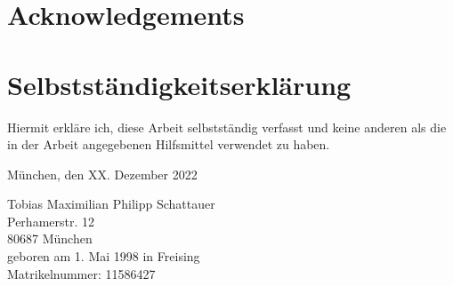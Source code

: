 \chapter*{Acknowledgements}



\chapter*{Selbstständigkeitserklärung}
Hiermit erkläre ich, diese Arbeit selbstständig verfasst und keine anderen als die in der Arbeit angegebenen Hilfsmittel verwendet zu haben.

\vspace{5cm}
München, den XX. Dezember 2022

\vspace{3cm}
Tobias Maximilian Philipp Schattauer \\
\ifprintversion
Perhamerstr. 12 \\
80687 München \\
geboren am 1. Mai 1998 in Freising \\
Matrikelnummer: 11586427
\fi